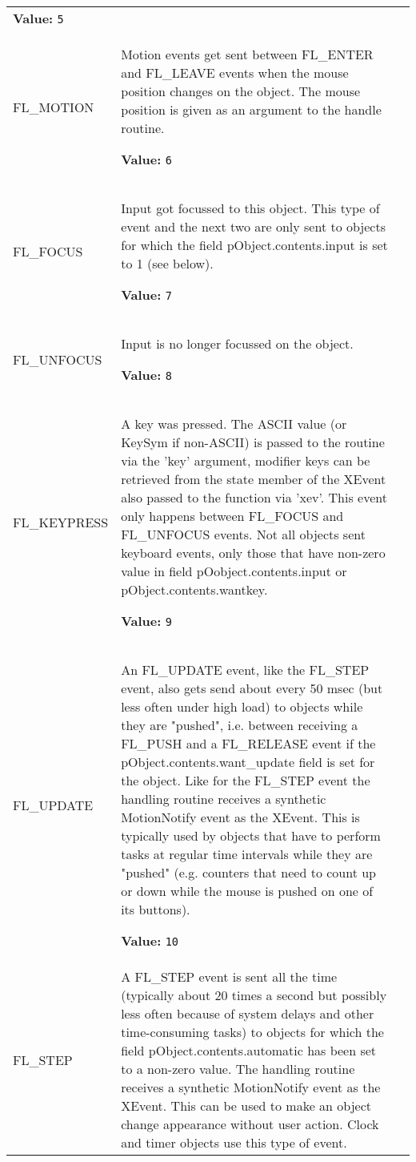 \begin{longtable}{|p{\varnamewidth}|p{\vardescrwidth}|l}
\textbf{Value:} 
{\tt 5}&\\
\cline{1-2}
\raggedright F\-L\-\_\-M\-O\-T\-I\-O\-N\- & \raggedright Motion events get sent between FL\_ENTER and FL\_LEAVE events 
          when the mouse position changes on the object. The mouse position
          is given as an argument to the handle routine.

\textbf{Value:} 
{\tt 6}&\\
\cline{1-2}
\raggedright F\-L\-\_\-F\-O\-C\-U\-S\- & \raggedright Input got focussed to this object. This type of event and the 
          next two are only sent to objects for which the field 
          pObject.contents.input is set to 1 (see below).

\textbf{Value:} 
{\tt 7}&\\
\cline{1-2}
\raggedright F\-L\-\_\-U\-N\-F\-O\-C\-U\-S\- & \raggedright Input is no longer focussed on the object.

\textbf{Value:} 
{\tt 8}&\\
\cline{1-2}
\raggedright F\-L\-\_\-K\-E\-Y\-P\-R\-E\-S\-S\- & \raggedright A key was pressed. The ASCII value (or KeySym if non-ASCII) is 
          passed to the routine via the 'key' argument, modifier keys can 
          be retrieved from the state member of the XEvent also passed to 
          the function via 'xev'. This event only happens between FL\_FOCUS
          and FL\_UNFOCUS events. Not all objects sent keyboard events, 
          only those that have non-zero value in field 
          pOobject.contents.input or pObject.contents.wantkey.

\textbf{Value:} 
{\tt 9}&\\
\cline{1-2}
\raggedright F\-L\-\_\-U\-P\-D\-A\-T\-E\- & \raggedright An FL\_UPDATE event, like the FL\_STEP event, also gets send 
          about every 50 msec (but less often under high load) to objects 
          while they are "pushed", i.e. between receiving a FL\_PUSH and a 
          FL\_RELEASE event if the pObject.contents.want\_update field is 
          set for the object. Like for the FL\_STEP event the handling 
          routine receives a synthetic MotionNotify event as the XEvent. 
          This is typically used by objects that have to perform tasks at 
          regular time intervals while they are "pushed" (e.g. counters 
          that need to count up or down while the mouse is pushed on one of
          its buttons).

\textbf{Value:} 
{\tt 10}&\\
\cline{1-2}
\raggedright F\-L\-\_\-S\-T\-E\-P\- & \raggedright A FL\_STEP event is sent all the time (typically about 20 times a
          second but possibly less often because of system delays and other
          time-consuming tasks) to objects for which the field 
          pObject.contents.automatic has been set to a non-zero value. The 
          handling routine receives a synthetic MotionNotify event as the 
          XEvent. This can be used to make an object change appearance 
          without user action. Clock and timer objects use this type of 
          event.


\end{longtable}
